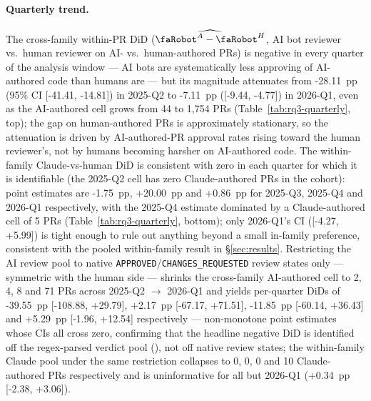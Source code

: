 
\paragraph{Quarterly trend.} The cross-family within-PR DiD ($\widehat{\rbt^A - \rbt^H}$, AI bot reviewer vs.\ human reviewer on AI- vs.\ human-authored PRs) is negative in every quarter of the analysis window --- AI bots are systematically less approving of AI-authored code than humans are --- but its magnitude attenuates from -28.11{}~pp (95\% CI [-41.41{}, -14.81{}]) in 2025-Q2 to -7.11{}~pp ([-9.44{}, -4.77{}]) in 2026-Q1, even as the AI-authored cell grows from 44{} to 1,754{} PRs (Table~\ref{tab:rq3-quarterly}, top); the gap on human-authored PRs is approximately stationary, so the attenuation is driven by AI-authored-PR approval rates rising toward the human reviewer's, not by humans becoming harsher on AI-authored code. The within-family Claude-vs-human DiD is consistent with zero in each quarter for which it is identifiable (the 2025-Q2 cell has zero Claude-authored PRs in the cohort): point estimates are -1.75{}~pp, +20.00{}~pp and +0.86{}~pp for 2025-Q3, 2025-Q4 and 2026-Q1 respectively, with the 2025-Q4 estimate dominated by a Claude-authored cell of 5{} PRs (Table~\ref{tab:rq3-quarterly}, bottom); only 2026-Q1's CI ([-4.27{}, +5.99{}]) is tight enough to rule out anything beyond a small in-family preference, consistent with the pooled within-family result in \S\ref{sec:results}. Restricting the AI review pool to native \texttt{APPROVED}/\texttt{CHANGES\_REQUESTED} review states only --- symmetric with the human side --- shrinks the cross-family AI-authored cell to 2{}, 4{}, 8{} and 71{} PRs across 2025-Q2 $\to$ 2026-Q1 and yields per-quarter DiDs of -39.55{}~pp [-108.88{}, +29.79{}], +2.17{}~pp [-67.17{}, +71.51{}], -11.85{}~pp [-60.14{}, +36.43{}] and +5.29{}~pp [-1.96{}, +12.54{}] respectively --- non-monotone point estimates whose CIs all cross zero, confirming that the headline negative DiD is identified off the regex-parsed verdict pool (), not off native review states; the within-family Claude pool under the same restriction collapses to 0{}, 0{}, 0{} and 10{} Claude-authored PRs respectively and is uninformative for all but 2026-Q1 (+0.34{}~pp [-2.38{}, +3.06{}]).

